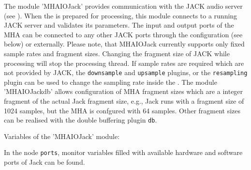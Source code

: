 The module 'MHAIOJack' provides communication with the JACK audio
server (see ).
%
When the \mhad{} is prepared for processing, this module connects to a
running JACK server and validates its parameters. The input and output
ports of the MHA can be connected to any other JACK ports through the
\mha{} configuration (see below) or externally. Please note, that
MHAIOJack currently supports only fixed sample rates and fragment
sizes. Changing the fragment size of JACK while processing will stop
the \mha{} processing thread. If sample rates are required which are not
provided by JACK, the {\tt downsample} and {\tt upsample} plugins, or
the {\tt resampling} plugin can be used to change the sampling rate inside
the \mha{}. The module 'MHAIOJackdb' allows configuration of MHA fragment
sizes which are a integer fragment of the actual Jack fragment size,
e.g., Jack runs with a fragment size of 1024 samples, but the MHA is
confgured with 64 samples.  Other fragment sizes can be realised with
the double buffering plugin {\tt db}.

Variables of the 'MHAIOJack' module:

\begin{description}





\end{description}

In the node \verb!ports!, monitor variables filled with available
hardware and software ports of Jack can be found.

